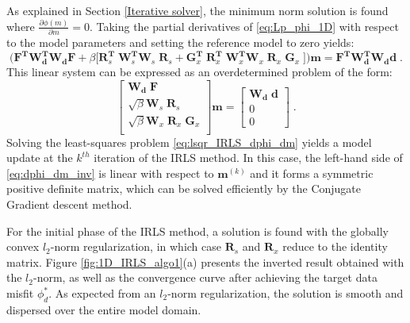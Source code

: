 As explained in Section \ref{Iterative solver}, the minimum norm solution is found where $\frac{\partial \phi(m)}{\partial m} = 0$.
Taking the partial derivatives of \ref{eq:Lp_phi_1D} with respect to the model parameters and setting the reference model to zero yields:
\begin{equation}\label{eq:dphi_dm_inv}
\Big ( \mathbf{F^TW_\text{d}^TW_\text{d}F} + \beta \big [ \mathbf{R}_s^{\mathbf{T}}\; \mathbf{W}_s^{\mathbf{T}} \mathbf{ W}_s \;\mathbf{ R}_s + \mathbf{G}_x^{\mathbf{T}} \;\mathbf{R}_x^{\mathbf{T}}\; \mathbf{W}_x^{\mathbf{T}}\mathbf{ W}_x \;\mathbf{R}_x \; \mathbf{G}_x \; \big]\Big ) 
\mathbf{m = F^TW_\text{d}^TW_\text{d}d} \;.
\end{equation}
This linear system can be expressed as an overdetermined problem of the form:
\begin{equation}\label{eq:lsqr_IRLS_dphi_dm}
 \begin{bmatrix}
\mathbf{W_\text{d}} \;\mathbf{F} \\
\sqrt{\beta} \mathbf{W}_s \;\mathbf{R}_s\\
\sqrt{\beta} \mathbf{W}_x \;\mathbf{R}_x \;\mathbf{G}_x \\
 \end{bmatrix} \mathbf{m} =
   \begin{bmatrix}
\mathbf{W_\text{d}} \; \mathbf{d}\\
0 \\
0
 \end{bmatrix} \;.
 \end{equation}
Solving the least-squares problem \ref{eq:lsqr_IRLS_dphi_dm} yields a model update at the $k^{th}$ iteration of the IRLS method.
In this case, the left-hand side of \ref{eq:dphi_dm_inv} is linear with respect to $\mathbf{m}^{(k)}$ and it forms a symmetric positive definite matrix, which can be solved efficiently by the Conjugate Gradient descent method.

For the initial phase of the IRLS method, a solution is found with the globally convex $l_2$-norm regularization, in which case $\mathbf{R}_s$ and $\mathbf{R}_x$ reduce to the identity matrix.
Figure \ref{fig:1D_IRLS_algo1}(a) presents the inverted result obtained with the $l_2$-norm, as well as the convergence curve after achieving the target data misfit $\phi_d^*$. 
As expected from an $l_2$-norm regularization, the solution is smooth and dispersed over the entire model domain.


